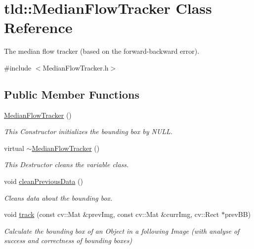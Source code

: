 \hypertarget{classtld_1_1MedianFlowTracker}{\section{tld\-:\-:Median\-Flow\-Tracker Class Reference}
\label{classtld_1_1MedianFlowTracker}
}


The median flow tracker (based on the forward-\/backward error).  




{\ttfamily \#include $<$Median\-Flow\-Tracker.\-h$>$}

\subsection*{Public Member Functions}
\begin{DoxyCompactItemize}
\item 
\hyperlink{classtld_1_1MedianFlowTracker_a10af34f4759e504cce93662c11714d7e}{Median\-Flow\-Tracker} ()
\begin{DoxyCompactList}\small\item\em This Constructor initializes the bounding box by N\-U\-L\-L. \end{DoxyCompactList}\item 
virtual \hyperlink{classtld_1_1MedianFlowTracker_a604feb65f62399c68b84ec5a981e528a}{$\sim$\-Median\-Flow\-Tracker} ()
\begin{DoxyCompactList}\small\item\em This Destructor cleans the variable class. \end{DoxyCompactList}\item 
void \hyperlink{classtld_1_1MedianFlowTracker_ad5c1599acad1607c20c7d2ca8aacf56c}{clean\-Previous\-Data} ()
\begin{DoxyCompactList}\small\item\em Cleans data about the bounding box. \end{DoxyCompactList}\item 
void \hyperlink{classtld_1_1MedianFlowTracker_addcc103122a93f098583b8f9cf72e8ff}{track} (const cv\-::\-Mat \&prev\-Img, const cv\-::\-Mat \&curr\-Img, cv\-::\-Rect $\ast$prev\-B\-B)
\begin{DoxyCompactList}\small\item\em Calculate the bounding box of an Object in a following Image (with analyse of success and correctness of bounding boxes) \end{DoxyCompactList}\end{DoxyCompactItemize}

